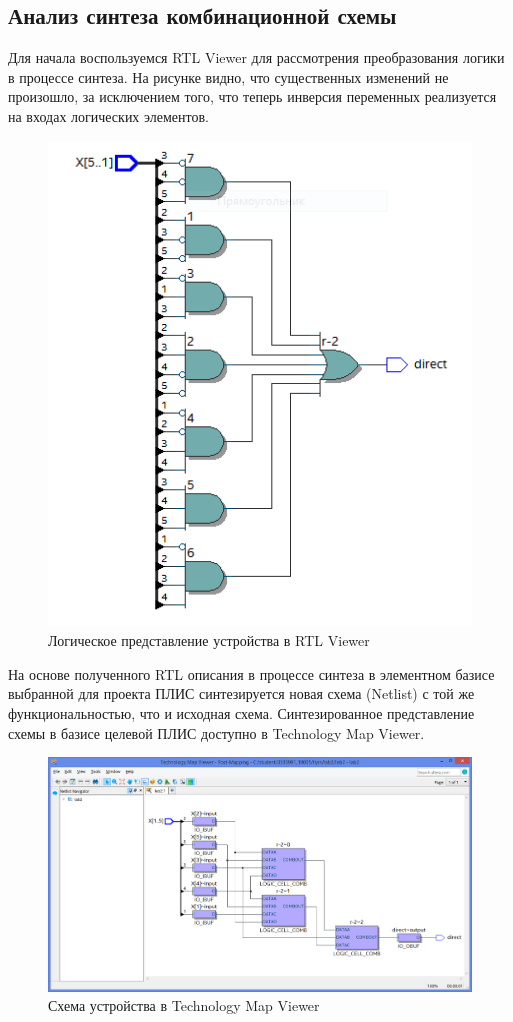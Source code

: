 \documentclass[a4paper,12pt]{article}
\begin{document}
	\subsection{Анализ синтеза комбинационной схемы}
	Для начала воспользуемся RTL Viewer для рассмотрения преобразования
	логики в процессе синтеза. На рисунке видно, что существенных изменений
	не произошло, за исключением того, что теперь инверсия переменных
	реализуется на входах логических элементов.
	\begin{figure}[H]
		\centering
		\includegraphics[width=0.5\linewidth]{subfiles/images/rtl}
		\caption{Логическое представление устройства в RTL Viewer}
		\label{fig:rtl}
	\end{figure}
	На основе полученного RTL описания в процессе синтеза в элементном
	базисе выбранной для проекта ПЛИС синтезируется новая схема (Netlist)
	с той же функциональностью, что и исходная схема. Синтезированное
	представление схемы в базисе целевой ПЛИС доступно в Technology Map Viewer.
	\begin{figure}[H]
		\centering
		\includegraphics[width=\linewidth]{subfiles/images/tmv}
		\caption{Схема устройства в Technology Map Viewer}
		\label{fig:rmv}
	\end{figure}
	
\end{document}
